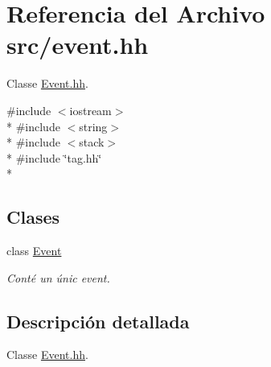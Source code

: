 \hypertarget{event_8hh}{}\section{Referencia del Archivo src/event.hh}
\label{event_8hh}


Classe \hyperlink{event_8hh}{Event.\+hh}.  


{\ttfamily \#include $<$iostream$>$}\\*
{\ttfamily \#include $<$string$>$}\\*
{\ttfamily \#include $<$stack$>$}\\*
{\ttfamily \#include \char`\"{}tag.\+hh\char`\"{}}\\*
\subsection*{Clases}
\begin{DoxyCompactItemize}
\item 
class \hyperlink{class_event}{Event}
\begin{DoxyCompactList}\small\item\em Conté un únic event. \end{DoxyCompactList}\end{DoxyCompactItemize}


\subsection{Descripción detallada}
Classe \hyperlink{event_8hh}{Event.\+hh}. 

